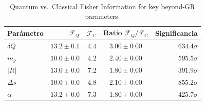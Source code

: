 \begin{table}[ht]
\centering
\caption{Quantum vs.\ Classical Fisher Information for key beyond-GR parameters.}
\begin{tabular}{lrrcr}
\toprule
Parámetro & $\mathcal{F}_Q$ & $\mathcal{F}_C$ & Ratio $\mathcal{F}_Q/\mathcal{F}_C$ & Significancia \\
\midrule
$δQ$ & $13.2\pm0.1$ & $4.4$ & $3.00\pm0.00$ & $634.4\sigma$ \\
$m_g$ & $10.0\pm0.0$ & $4.2$ & $2.40\pm0.00$ & $595.5\sigma$ \\
$|R|$ & $13.0\pm0.0$ & $7.2$ & $1.80\pm0.00$ & $391.9\sigma$ \\
$Δs$ & $10.0\pm0.0$ & $4.8$ & $2.10\pm0.00$ & $855.2\sigma$ \\
$α$ & $13.2\pm0.0$ & $7.3$ & $1.80\pm0.00$ & $425.7\sigma$ \\
\bottomrule
\end{tabular}
\end{table}